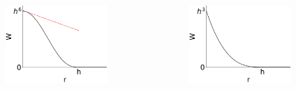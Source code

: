 \documentclass[aspectratio=169]{beamer}
\begin{document}
\begin{frame}
\begin{columns}
\begin{column}{0.45\textwidth}
\begin{figure}
\includegraphics[width=0.9\textwidth]{pictures/slope.png}
\end{figure}
\end{column}
\begin{column}{0.45\textwidth}
\begin{figure}
\includegraphics[width=0.9\textwidth]{pictures/smoothing_kernel_2.png}
\end{figure}
\end{column}
\end{columns}
\end{frame}
\end{document}
